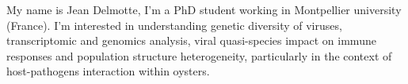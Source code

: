 

\begin{cvparagraph}

My name is Jean Delmotte, I'm a PhD student working in Montpellier university (France). I'm interested in understanding genetic diversity of viruses, transcriptomic and genomics analysis, viral quasi-species impact on immune responses and population structure heterogeneity, particularly in the context of host-pathogens interaction within oysters.
\end{cvparagraph}
